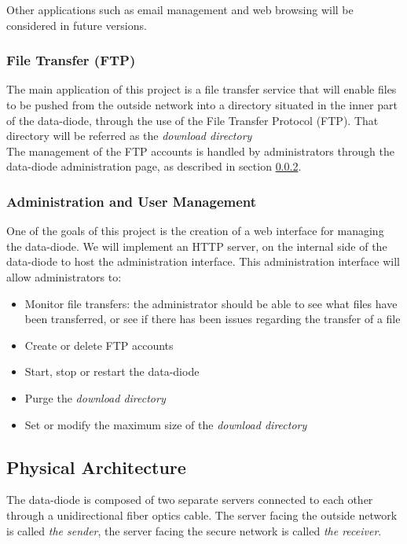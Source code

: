 \documentclass[a4paper,11pt]{article}
\begin{document}
Other applications such as email management and web browsing will be considered in future versions.

\subsubsection{File Transfer (FTP)}
The main application of this project is a file transfer service that will enable files to be pushed from the outside network into a directory situated in the inner part of the data-diode, through the use of the File Transfer Protocol (FTP). That directory will be referred as the \textit{download directory}\\

The management of the FTP accounts is handled by administrators through the data-diode administration page, as described in section \ref{sec:administration}.

\subsubsection{Administration and User Management}
\label{sec:administration}
One of the goals of this project is the creation of a web interface for managing the data-diode. We will implement an HTTP server, on the internal side of the data-diode to host the administration interface. This administration interface will allow administrators to:

\begin{itemize}
\item{Monitor file transfers: the administrator should be able to see what files have been transferred, or see if there has been issues regarding the transfer of a file}
\item{Create or delete FTP accounts}
\item{Start, stop or restart the data-diode}
\item{Purge the \textit{download directory}}
\item{Set or modify the maximum size of the \textit{download directory}}
\end{itemize} 


\subsection{Physical Architecture}
The data-diode is composed of two separate servers connected to each other through a unidirectional fiber optics cable. The server facing the outside network is called \textit{the sender}, the server facing the secure network is called \textit{the receiver}.\\
\end{document}
